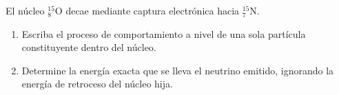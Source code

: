 \item El núcleo $^{15}_{8}\text{O}$ decae mediante captura electrónica hacia $^{15}_{7}\text{N}$.
\begin{enumerate}
    \item Escriba el proceso de comportamiento a nivel de una sola partícula constituyente dentro del núcleo.
    \item Determine la energía exacta que se lleva el neutrino emitido, ignorando la energía de retroceso del núcleo hija.
\end{enumerate}